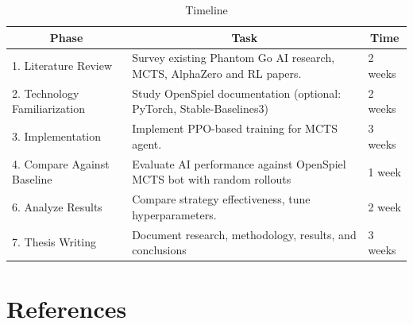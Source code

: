 \documentclass[12pt,oneside,openright]{article}
\begin{document}
\begin{table}[H]
    \caption{Timeline}
    \centering
    \begin{tabularx}{\textwidth}{X|X|l}
        \toprule
        \multicolumn{1}{c}{Phase}     &
        \multicolumn{1}{c}{Task}      &
        \multicolumn{1}{c}{Time}                                                                                          \\
        \midrule
        1. Literature Review          & Survey existing Phantom Go AI research, MCTS, AlphaZero and RL papers.  & 2 weeks \\
        \hline
        2. Technology Familiarization & Study OpenSpiel documentation (optional: PyTorch, Stable-Baselines3)    & 2 weeks \\
        \hline
        3. Implementation             & Implement PPO-based training for MCTS agent.                            & 3 weeks \\
        \hline
        4. Compare Against Baseline   & Evaluate AI performance against OpenSpiel MCTS bot with random rollouts & 1 week  \\
        \hline
        6. Analyze Results            & Compare strategy effectiveness, tune hyperparameters.                   & 2 week  \\
        \hline
        7. Thesis Writing             & Document research, methodology, results, and conclusions                & 3 weeks \\
        \hline
    \end{tabularx}
    \label{tab:timeline}
\end{table}


\section{References}
\printbibliography[heading=none]
\end{document}

